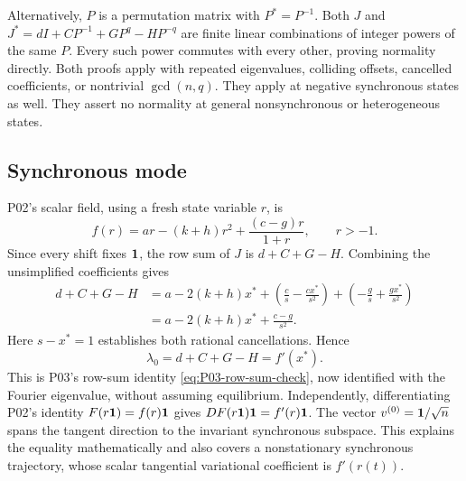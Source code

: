 Alternatively, $P$ is a permutation matrix with $P^*=P^{-1}$.
Both $J$ and $J^*=dI+CP^{-1}+GP^q-HP^{-q}$ are finite linear
combinations of integer powers of the same $P$. Every such power
commutes with every other, proving normality directly. Both proofs
apply with repeated eigenvalues, colliding offsets, cancelled
coefficients, or nontrivial $\gcd(n,q)$. They apply at negative
synchronous states as well. They assert no normality at general
nonsynchronous or heterogeneous states.

\subsection{Synchronous mode}

P02's scalar field, using a fresh state variable $r$, is
\[
 f(r)=ar-(k+h)r^2+\frac{(c-g)r}{1+r},\qquad r>-1.
\]
Since every shift fixes $\mathbf{1}$, the row sum of $J$ is
$d+C+G-H$. Combining the unsimplified coefficients gives
\begin{align*}
 d+C+G-H
 &=a-2(k+h)x^*+
       \left(\frac{c}{s}-\frac{cx^*}{s^2}\right)
       +\left(-\frac{g}{s}+\frac{gx^*}{s^2}\right)\\
 &=a-2(k+h)x^*+\frac{c-g}{s^2}.
\end{align*}
Here $s-x^*=1$ establishes both rational cancellations. Hence
\begin{equation}
 \boxed{\lambda_0=d+C+G-H=f'(x^*).}
 \label{eq:P04-synchronous-derivative}
\end{equation}
This is P03's row-sum identity \eqref{eq:P03-row-sum-check}, now
identified with the Fourier eigenvalue, without assuming equilibrium.
Independently, differentiating P02's identity
$F(r\mathbf{1})=f(r)\mathbf{1}$ gives $DF(r\mathbf{1})\mathbf{1}=f'(r)\mathbf{1}$.
The vector $v^{(0)}=\mathbf{1}/\sqrt n$ spans the tangent direction
to the invariant synchronous subspace. This explains the equality
mathematically and also covers a nonstationary synchronous trajectory,
whose scalar tangential variational coefficient is $f'(r(t))$.

